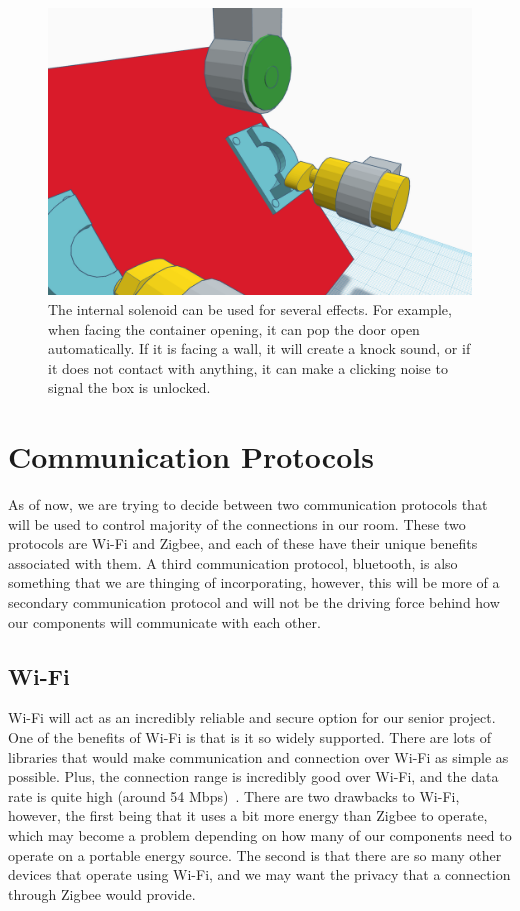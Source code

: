 \documentclass[conference]{IEEEtran}
\begin{document}
\begin{figure}[H]
    \centering
    \includegraphics[width=0.85\columnwidth]{Images/OpenContainer.png}
    \caption{The internal solenoid can be used for several effects. For example, when facing the container opening, it can pop the 
    door open automatically. If it is facing a wall, it will create a knock sound, or if it does not contact with anything, it can
    make a clicking noise to signal the box is unlocked.}
\end{figure}

\section{Communication Protocols}
As of now, we are trying to decide between two communication protocols that will be used
to control majority of the connections in our room. These two protocols are Wi-Fi and Zigbee,
and each of these have their unique benefits associated with them. A third communication
protocol, bluetooth, is also something that we are thinging of incorporating, however, this
will be more of a secondary communication protocol and will not be the driving force behind
how our components will communicate with each other.

\subsection*{Wi-Fi}
Wi-Fi will act as an incredibly reliable and secure option for our senior project. One of the benefits of Wi-Fi
is that is it so widely supported. There are lots of libraries that would make communication and connection over
Wi-Fi as simple as possible. Plus, the connection range is incredibly good over Wi-Fi, and the data rate is quite high
(around 54 Mbps)~\cite{wifiVsZigbee}. There are two drawbacks to Wi-Fi, however, the first being that it uses a bit more energy than Zigbee
to operate, which may become a problem depending on how many of our components need to operate on a portable energy
source. The second is that there are so many other devices that operate using Wi-Fi, and we may want the privacy that
a connection through Zigbee would provide.
\end{document}
